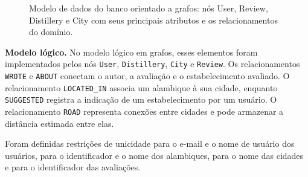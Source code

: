 \documentclass{jaes}
\newcommand{\tstr}{\textcolor{tString}{String}}
\newcommand{\tpnt}{\textcolor{tPoint}{Point}}
\newcommand{\tbol}{\textcolor{tBool}{Boolean}}
\begin{document}
\begin{figure}[t]
\caption{Modelo de dados do banco orientado a grafos: nós \textsf{User}, \textsf{Review}, \textsf{Distillery} e \textsf{City} com seus principais atributos e os relacionamentos do domínio.}
\label{fig:modelo-logico}
\end{figure}

\textbf{Modelo lógico.}
No modelo lógico em grafos, esses elementos foram implementados pelos nós \texttt{User}, \texttt{Distillery}, \texttt{City} e \texttt{Review}. Os relacionamentos \texttt{WROTE} e \texttt{ABOUT} conectam o autor, a avaliação e o estabelecimento avaliado. O relacionamento \texttt{LOCATED\_IN} associa um alambique à sua cidade, enquanto \texttt{SUGGESTED} registra a indicação de um estabelecimento por um usuário. O relacionamento \texttt{ROAD} representa conexões entre cidades e pode armazenar a distância estimada entre elas.

Foram definidas restrições de unicidade para o e-mail e o nome de usuário dos usuários, para o identificador e o nome dos alambiques, para o nome das cidades e para o identificador das avaliações.
\end{document}

